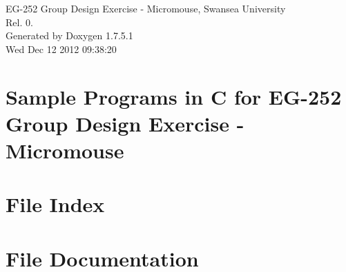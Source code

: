 \documentclass[a4paper]{book}
\begin{document}
\hypersetup{pageanchor=false,citecolor=blue}
\begin{titlepage}
\vspace*{7cm}
\begin{center}
{\Large \-E\-G-\/252 \-Group \-Design \-Exercise -\/ \-Micromouse, \-Swansea \-University \\[1ex]\large \-Rel. 0. }\\
\vspace*{1cm}
{\large \-Generated by Doxygen 1.7.5.1}\\
\vspace*{0.5cm}
{\small Wed Dec 12 2012 09:38:20}\\
\end{center}
\end{titlepage}
\clearemptydoublepage
{}
\tableofcontents
\clearemptydoublepage
{}
\hypersetup{pageanchor=true,citecolor=blue}
\chapter{\-Sample \-Programs in \-C for \-E\-G-\/252 \-Group \-Design \-Exercise -\/ \-Micromouse}
\label{index}\hypertarget{index}{}
\chapter{\-File \-Index}

\chapter{\-File \-Documentation}








\printindex
\end{document}
